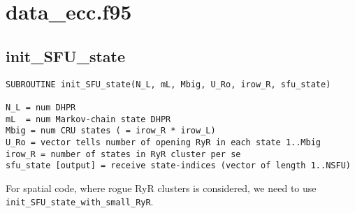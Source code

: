 \chapter{data\_ecc.f95}

\section{init\_SFU\_state}
\label{sec:init_SFU_state}

\begin{verbatim}
SUBROUTINE init_SFU_state(N_L, mL, Mbig, U_Ro, irow_R, sfu_state)

N_L = num DHPR
mL  = num Markov-chain state DHPR
Mbig = num CRU states ( = irow_R * irow_L)
U_Ro = vector tells number of opening RyR in each state 1..Mbig
irow_R = number of states in RyR cluster per se
sfu_state [output] = receive state-indices (vector of length 1..NSFU)
\end{verbatim}

For spatial code, where rogue RyR clusters is considered, we need to use
\verb!init_SFU_state_with_small_RyR!.
